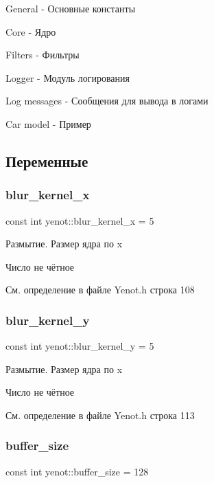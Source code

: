 General -\/ Основные константы

Core -\/ Ядро

Filters -\/ Фильтры

Logger -\/ Модуль логирования

Log messages -\/ Сообщения для вывода в логами

Car model -\/ Пример 

\subsection{Переменные}
\mbox{\label{namespaceyenot_a1b60119efa619ee2a1a927d430e984d2}} 
\subsubsection{\texorpdfstring{blur\+\_\+kernel\+\_\+x}{blur\_kernel\_x}}
{\footnotesize\ttfamily const int yenot\+::blur\+\_\+kernel\+\_\+x = 5}

Размытие. Размер ядра по x

Число не чётное 

См. определение в файле Yenot.\+h строка 108

\mbox{\label{namespaceyenot_ad178c04ee8518b1553ee1ab5b5054712}} 
\subsubsection{\texorpdfstring{blur\+\_\+kernel\+\_\+y}{blur\_kernel\_y}}
{\footnotesize\ttfamily const int yenot\+::blur\+\_\+kernel\+\_\+y = 5}

Размытие. Размер ядра по x

Число не чётное 

См. определение в файле Yenot.\+h строка 113

\mbox{\label{namespaceyenot_adc382d9413986f36649df4f983cf1ebe}} 
\subsubsection{\texorpdfstring{buffer\+\_\+size}{buffer\_size}}
{\footnotesize\ttfamily const int yenot\+::buffer\+\_\+size = 128}




